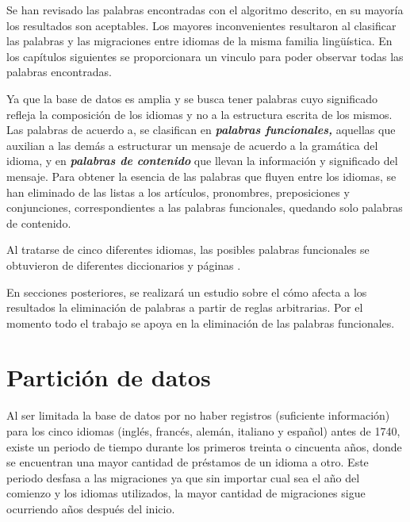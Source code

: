 Se han revisado las palabras encontradas con el algoritmo descrito, en su
mayoría los resultados son aceptables. Los mayores inconvenientes resultaron al
clasificar las palabras y las migraciones entre idiomas de la misma familia
lingüística.  En los capítulos siguientes se proporcionara un vinculo para
poder observar todas las palabras encontradas. 

Ya que  la base de datos es amplia y se busca tener palabras cuyo significado
refleja la composición de los idiomas y no a la estructura escrita de los
mismos. Las
palabras de acuerdo a\cite{contenidopal}, se clasifican en
\textbf{\textit{palabras funcionales,}} aquellas que auxilian a las demás a
estructurar un mensaje de acuerdo a la gramática del idioma, y en
\textbf{\textit{palabras de contenido}} que llevan la información y significado
del mensaje. Para obtener la esencia de las palabras que fluyen entre los
idiomas, se han eliminado de las listas a los artículos, pronombres,
preposiciones y conjunciones, correspondientes a las palabras funcionales,
quedando solo palabras de contenido. 

Al tratarse de cinco diferentes idiomas, las posibles palabras funcionales se
obtuvieron de diferentes diccionarios y páginas \cite{englishdic, frenchdic,
germandic, italiandic, spanishdic}.

En secciones posteriores, se realizará un estudio sobre el cómo afecta a los
resultados la eliminación de palabras a partir de reglas arbitrarias.  Por el
momento todo el trabajo se apoya en la eliminación de las palabras funcionales.
\section{Partición de datos} %


Al ser limitada la base de datos por no haber registros (suficiente
información) para los cinco idiomas (inglés, francés, alemán, italiano y
español) antes de 1740,  existe un periodo de tiempo durante los primeros
treinta o cincuenta años, donde se encuentran una mayor cantidad de préstamos
de un idioma a otro. Este periodo desfasa a  las migraciones ya que sin
importar cual sea el año del comienzo y los idiomas utilizados,  la mayor
cantidad de migraciones sigue ocurriendo años después del inicio.   

